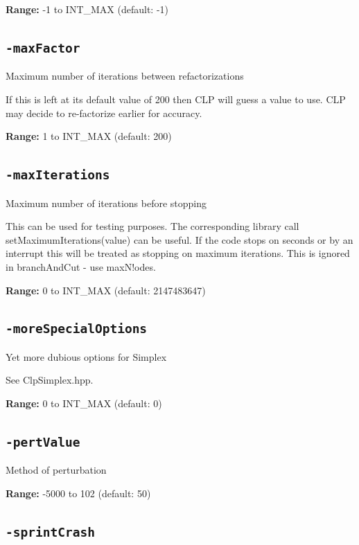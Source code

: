 \documentclass[11pt,a4paper]{article}
\begin{document}
\textbf{Range:} -1 to INT\_MAX (default: -1)

\subsection*{\texttt{-maxFactor}}

Maximum number of iterations between refactorizations

If this is left at its default value of 200 then CLP will guess a  value to use.  CLP may decide to re-factorize earlier for accuracy.

\textbf{Range:} 1 to INT\_MAX (default: 200)

\subsection*{\texttt{-maxIterations}}

Maximum number of iterations before stopping

This can be used for testing purposes.  The corresponding library call
 	setMaximumIterations(value)
 can be useful.  If the code stops on seconds or by an interrupt this will be treated as stopping on maximum iterations. This is ignored in branchAndCut - use maxN!odes.

\textbf{Range:} 0 to INT\_MAX (default: 2147483647)

\subsection*{\texttt{-moreSpecialOptions}}

Yet more dubious options for Simplex

See ClpSimplex.hpp.

\textbf{Range:} 0 to INT\_MAX (default: 0)

\subsection*{\texttt{-pertValue}}

Method of perturbation

\textbf{Range:} -5000 to 102 (default: 50)

\subsection*{\texttt{-sprintCrash}}
\end{document}
